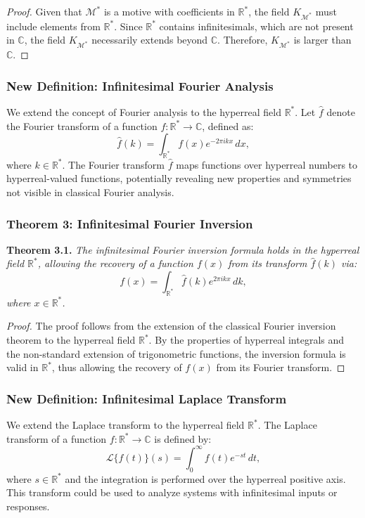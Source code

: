 \documentclass{article}
\begin{document}
\begin{proof}
Given that \(\mathcal{M}^*\) is a motive with coefficients in \(\mathbb{R}^*\), the field \(K_{\mathcal{M}^*}\) must include elements from \(\mathbb{R}^*\). Since \(\mathbb{R}^*\) contains infinitesimals, which are not present in \(\mathbb{C}\), the field \(K_{\mathcal{M}^*}\) necessarily extends beyond \(\mathbb{C}\). Therefore, \(K_{\mathcal{M}^*}\) is larger than \(\mathbb{C}\).
\end{proof}

\subsubsection{New Definition: Infinitesimal Fourier Analysis}
We extend the concept of Fourier analysis to the hyperreal field \(\mathbb{R}^*\). Let \(\widehat{f}\) denote the Fourier transform of a function \(f: \mathbb{R}^* \to \mathbb{C}\), defined as:
\[
\widehat{f}(k) = \int_{\mathbb{R}^*} f(x) e^{-2\pi i k x} \, dx,
\]
where \(k \in \mathbb{R}^*\). The Fourier transform \(\widehat{f}\) maps functions over hyperreal numbers to hyperreal-valued functions, potentially revealing new properties and symmetries not visible in classical Fourier analysis.

\subsubsection{Theorem 3: Infinitesimal Fourier Inversion}
\textbf{Theorem 3.1.} \textit{The infinitesimal Fourier inversion formula holds in the hyperreal field \(\mathbb{R}^*\), allowing the recovery of a function \(f(x)\) from its transform \(\widehat{f}(k)\) via:
\[
f(x) = \int_{\mathbb{R}^*} \widehat{f}(k) e^{2\pi i k x} \, dk,
\]
where \(x \in \mathbb{R}^*\).}

\begin{proof}
The proof follows from the extension of the classical Fourier inversion theorem to the hyperreal field \(\mathbb{R}^*\). By the properties of hyperreal integrals and the non-standard extension of trigonometric functions, the inversion formula is valid in \(\mathbb{R}^*\), thus allowing the recovery of \(f(x)\) from its Fourier transform.
\end{proof}

\subsubsection{New Definition: Infinitesimal Laplace Transform}
We extend the Laplace transform to the hyperreal field \(\mathbb{R}^*\). The Laplace transform of a function \(f: \mathbb{R}^* \to \mathbb{C}\) is defined by:
\[
\mathcal{L}\{f(t)\}(s) = \int_{0}^{\infty} f(t) e^{-st} \, dt,
\]
where \(s \in \mathbb{R}^*\) and the integration is performed over the hyperreal positive axis. This transform could be used to analyze systems with infinitesimal inputs or responses.
\end{document}
